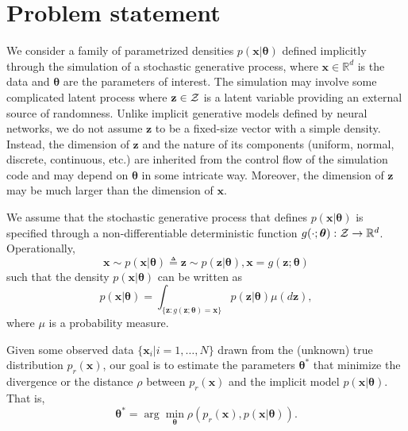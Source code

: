 \documentclass{article}
\newcommand{\bftheta}{{\bm \theta}}
\newcommand{\bfx}{\mathbf{x}}
\newcommand{\bfz}{\mathbf{z}}
\theoremstyle{plain}
\begin{document}

\section{Problem statement}
\label{sec:problem}

We consider a family of parametrized densities $p(\mathbf{x}|\bftheta)$
defined implicitly through the simulation of a stochastic generative process,
where $\mathbf{x} \in \mathbb{R}^d$ is the data and $\bftheta$ are the
parameters of interest. The simulation may involve some complicated latent
process
where $\bfz \in {\cal Z}$ is a latent variable providing an external
source of randomness.
Unlike implicit generative models defined by neural networks, we do not assume
$\bfz$ to be a fixed-size vector with a simple density. Instead, the
dimension of $\bfz$ and the nature of its components (uniform, normal,
discrete, continuous, etc.) are inherited from the control flow of the
simulation code and may depend on $\bftheta$ in some intricate way. Moreover,
the dimension of $\bfz$ may be much larger than the dimension of
$\bfx$.

We assume that the stochastic generative process that defines $p(\mathbf{x}|\bftheta)$ is
specified through a non-differentiable deterministic function $g(\cdot; \bftheta) : {\cal Z} \to
\mathbb{R}^d$. Operationally, %
\begin{equation}\label{eqn:p_theta}
    \mathbf{x} \sim p(\mathbf{x}|\bftheta) \triangleq \bfz \sim p(\bfz|\bftheta), \mathbf{x} = g(\bfz; \bftheta)
\end{equation}
such that the density $p(\mathbf{x}|\bftheta)$ can be
written as
\begin{equation}\label{eqn:p_x_sim}
    p(\mathbf{x}|\bftheta) = \int_{\{\bfz:g(\bfz;\bftheta) = \bfx \}} p(\bfz|\bftheta) \mu(d\bfz),
\end{equation}
where $\mu$ is a probability measure.

Given some observed data $\{ \mathbf{x}_i | i=1, \dots, N \}$ drawn from the
(unknown) true distribution $p_r(\mathbf{x})$, our goal is to estimate the parameters
$\bftheta^*$ that minimize the divergence or the distance $\rho$ between $p_r(\mathbf{x})$ and
the implicit model $p(\mathbf{x}|\bftheta)$. That is,
\begin{equation}
    \bftheta^* = \arg \min_{\bftheta} \rho(p_r(\mathbf{x}), p(\mathbf{x}|\bftheta)).
\end{equation}
\end{document}
